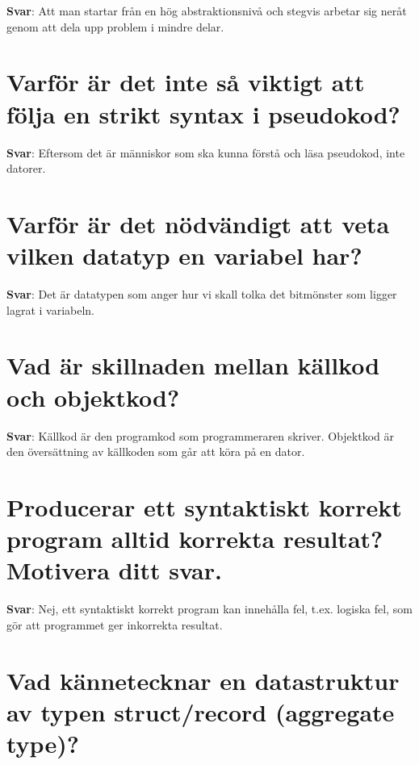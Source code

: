 \documentclass[a4paper,11pt,oneside]{book}
\begin{document}
\begin{sloppypar}
\label{q:189:sa:sv:True}

\textbf{Svar}: Att man startar fr\r{a}n en h\"og abstraktionsniv\r{a} och stegvis arbetar sig ner\r{a}t genom att dela upp problem i mindre delar.



\section{Varf\"or \"ar det inte s\r{a} viktigt att f\"olja en strikt syntax i pseudokod?}

\label{q:190:sa:sv:True}

\textbf{Svar}: Eftersom det \"ar m\"anniskor som ska kunna f\"orst\r{a} och l\"asa pseudokod, inte datorer.



\section{Varf\"or \"ar det n\"odv\"andigt att veta vilken datatyp en variabel har?}

\label{q:191:sa:sv:True}

\textbf{Svar}: Det \"ar datatypen som anger hur vi skall tolka det bitm\"onster som ligger lagrat i variabeln.



\section{Vad \"ar skillnaden mellan k\"allkod och objektkod?}

\label{q:192:sa:sv:True}

\textbf{Svar}: K\"allkod \"ar den programkod som programmeraren skriver. Objektkod \"ar den \"overs\"attning av k\"allkoden som g\r{a}r att k\"ora p\r{a} en dator.



\section{Producerar ett syntaktiskt korrekt program alltid korrekta resultat? Motivera ditt svar.}

\label{q:193:sa:sv:True}

\textbf{Svar}: Nej, ett syntaktiskt korrekt program kan inneh\r{a}lla fel, t.ex. logiska fel, som g\"or att programmet ger inkorrekta resultat.



\section{Vad k\"annetecknar en datastruktur av typen struct/record (aggregate type)?}


\end{sloppypar}
\end{document}
